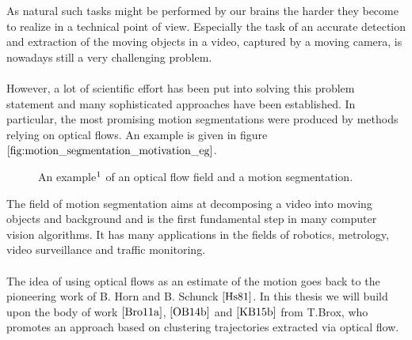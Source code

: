 As natural such tasks might be performed by our brains the harder they become to realize in a technical point of view. Especially the task of an accurate detection and extraction of the moving objects in a video, captured by a moving camera, is nowadays still a very challenging problem. \\ \\
However, a lot of scientific effort has been put into solving this problem statement and many sophisticated approaches have been established. In particular, the most promising motion segmentations were produced by methods relying on optical flows. An example is given in figure $\ref{fig:motion_segmentation_motivation_eg}$.
\begin{figure}[H]
\begin{center}
\end{center}
\caption[Motion Segmentation Motivation Example]{An example$\footnotemark$ of an optical flow field and a motion segmentation. }
\label{fig:motion_segmentation_motivation_eg}
\end{figure}
The field of motion segmentation aims at decomposing a video into moving objects and background and is the first fundamental step in many computer vision algorithms. It has many applications in the fields of robotics, metrology, video surveillance and traffic monitoring. \\ \\
The idea of using optical flows as an estimate of the motion goes back to the pioneering work of B. Horn and B. Schunck $\cite{Hs81}$. In this thesis we will build upon the body of work $\cite{Bro11a}$, $\cite{OB14b}$ and $\cite{KB15b}$ from T.Brox, who promotes an approach based on clustering trajectories extracted via optical flow. \\ \\
